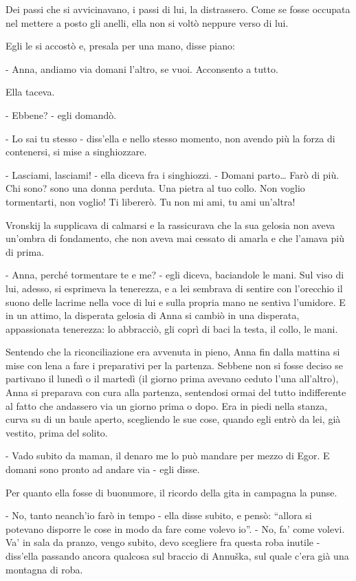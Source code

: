 Dei passi che si avvicinavano, i passi di lui, la distrassero. Come se fosse occupata nel mettere a posto gli anelli, ella non si voltò neppure verso di lui. 

Egli le si accostò e, presala per una mano, disse piano: 

- Anna, andiamo via domani l'altro, se vuoi. Acconsento a tutto. 

Ella taceva. 

- Ebbene? - egli domandò. 

- Lo sai tu stesso - diss'ella e nello stesso momento, non avendo più la forza di contenersi, si mise a singhiozzare. 

- Lasciami, lasciami! - ella diceva fra i singhiozzi. - Domani parto\ldots{} Farò di più. Chi sono? sono una donna perduta. Una pietra al tuo collo. Non voglio tormentarti, non voglio! Ti libererò. Tu non mi ami, tu ami un'altra! 

Vronskij la supplicava di calmarsi e la rassicurava che la sua gelosia non aveva un'ombra di fondamento, che non aveva mai cessato di amarla e che l'amava più di prima. 

- Anna, perché tormentare te e me? - egli diceva, baciandole le mani. Sul viso di lui, adesso, si esprimeva la tenerezza, e a lei sembrava di sentire con l'orecchio il suono delle lacrime nella voce di lui e sulla propria mano ne sentiva l'umidore. E in un attimo, la disperata gelosia di Anna si cambiò in una disperata, appassionata tenerezza: lo abbracciò, gli coprì di baci la testa, il collo, le mani. 

\label{xxv-5} 

Sentendo che la riconciliazione era avvenuta in pieno, Anna fin dalla mattina si mise con lena a fare i preparativi per la partenza. Sebbene non si fosse deciso se partivano il lunedì o il martedì (il giorno prima avevano ceduto l'una all'altro), Anna si preparava con cura alla partenza, sentendosi ormai del tutto indifferente al fatto che andassero via un giorno prima o dopo. Era in piedi nella stanza, curva su di un baule aperto, scegliendo le sue cose, quando egli entrò da lei, già vestito, prima del solito. 

- Vado subito da maman, il denaro me lo può mandare per mezzo di Egor. E domani sono pronto ad andare via - egli disse. 

Per quanto ella fosse di buonumore, il ricordo della gita in campagna la punse. 

- No, tanto neanch'io farò in tempo - ella disse subito, e pensò: ``allora si potevano disporre le cose in modo da fare come volevo io''. - No, fa' come volevi. Va' in sala da pranzo, vengo subito, devo scegliere fra questa roba inutile - diss'ella passando ancora qualcosa sul braccio di Annuška, sul quale c'era già una montagna di roba. 


